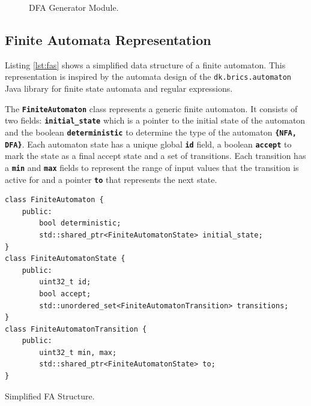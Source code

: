\begin{figure}[H]
    \centering
    \caption{DFA Generator Module.}
    \label{fig:sa2}
\end{figure}

\subsection{Finite Automata Representation}
Listing \ref{lst:fas} shows a simplified data structure of a finite automaton. This representation is inspired by the automata design of the \texttt{dk.brics.automaton} \cite{dk} Java library for finite state automata and regular expressions.

The \texttt{\textbf{FiniteAutomaton}} class represents a generic finite automaton. It consists of two fields: \texttt{\textbf{initial\_state}} which is a pointer to the initial state of the automaton and the boolean \texttt{\textbf{deterministic}} to determine the type of the automaton \texttt{\textbf{\{NFA, DFA\}}}. Each automaton state has a unique global \texttt{\textbf{id}} field, a boolean \texttt{\textbf{accept}} to mark the state as a final accept state and a set of transitions. Each transition has a \texttt{\textbf{min}} and \texttt{\textbf{max}} fields to represent the range of input values that the transition is active for and a pointer \texttt{\textbf{to}} that represents the next state. 

\begin{listing}[H]
\begin{verbatim}
class FiniteAutomaton {
    public:
        bool deterministic;
        std::shared_ptr<FiniteAutomatonState> initial_state;
}
class FiniteAutomatonState {
    public:
        uint32_t id;
        bool accept;
        std::unordered_set<FiniteAutomatonTransition> transitions;
}
class FiniteAutomatonTransition {
    public:
        uint32_t min, max;
        std::shared_ptr<FiniteAutomatonState> to;
}
\end{verbatim}
\caption{Simplified FA Structure.}\label{lst:fas}
\end{listing}

